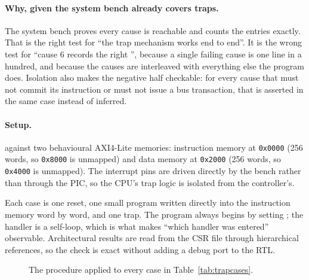 \paragraph{Why, given the system bench already covers traps.} The system bench
proves every cause is reachable and counts the entries exactly. That is the
right test for ``the trap mechanism works end to end''. It is the wrong test for
``cause 6 records the right '', because a single failing cause is one
line in a hundred, and because the causes are interleaved with everything else
the program does. Isolation also makes the negative half checkable: for every
cause that must not commit its instruction or must not issue a bus transaction,
that is asserted in the same case instead of inferred.

\paragraph{Setup.}  against two behavioural AXI4-Lite memories:
instruction memory at \texttt{0x0000} (256 words, so \texttt{0x8000} is
unmapped) and data memory at \texttt{0x2000} (256 words, so \texttt{0x4000} is
unmapped). The interrupt pins are driven directly by the bench rather than
through the PIC, so the CPU's trap logic is isolated from the controller's.

Each case is one reset, one small program written directly into the instruction
memory word by word, and one trap. The program always begins by setting
; the handler is a self-loop, which is what makes ``which handler was
entered'' observable. Architectural results are read from the CSR file through
hierarchical references, so the check is exact without adding a debug port to
the RTL.

\begin{figure}[H]
\centering
{}
\caption{The procedure applied to every case in Table~\ref{tab:trapcases}.}
\label{fig:trapproc}
\end{figure}

